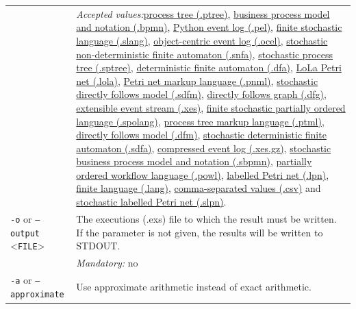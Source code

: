 {\begin{tabularx}{\linewidth}{lX}
&\textit{Accepted values:}\quad \hyperref[filehandler:process tree]{process tree (.ptree)}, \hyperref[filehandler:business process model and notation]{business process model and notation (.bpmn)}, \hyperref[filehandler:Python event log]{Python event log (.pel)}, \hyperref[filehandler:finite stochastic language]{finite stochastic language (.slang)}, \hyperref[filehandler:object-centric event log]{object-centric event log (.ocel)}, \hyperref[filehandler:stochastic non-deterministic finite automaton]{stochastic non-deterministic finite automaton (.snfa)}, \hyperref[filehandler:stochastic process tree]{stochastic process tree (.sptree)}, \hyperref[filehandler:deterministic finite automaton]{deterministic finite automaton (.dfa)}, \hyperref[filehandler:LoLa Petri net]{LoLa Petri net (.lola)}, \hyperref[filehandler:Petri net markup language]{Petri net markup language (.pnml)}, \hyperref[filehandler:stochastic directly follows model]{stochastic directly follows model (.sdfm)}, \hyperref[filehandler:directly follows graph]{directly follows graph (.dfg)}, \hyperref[filehandler:extensible event stream]{extensible event stream (.xes)}, \hyperref[filehandler:finite stochastic partially ordered language]{finite stochastic partially ordered language (.spolang)}, \hyperref[filehandler:process tree markup language]{process tree markup language (.ptml)}, \hyperref[filehandler:directly follows model]{directly follows model (.dfm)}, \hyperref[filehandler:stochastic deterministic finite automaton]{stochastic deterministic finite automaton (.sdfa)}, \hyperref[filehandler:compressed event log]{compressed event log (.xes.gz)}, \hyperref[filehandler:stochastic business process model and notation]{stochastic business process model and notation (.sbpmn)}, \hyperref[filehandler:partially ordered workflow language]{partially ordered workflow language (.powl)}, \hyperref[filehandler:labelled Petri net]{labelled Petri net (.lpn)}, \hyperref[filehandler:finite language]{finite language (.lang)}, \hyperref[filehandler:comma-separated values]{comma-separated values (.csv)} and \hyperref[filehandler:stochastic labelled Petri net]{stochastic labelled Petri net (.slpn)}.\\
\texttt{-o} or \texttt{--output} <\texttt{FILE}> &
The executions (.exs) file to which the result must be written. If the parameter is not given, the results will be written to STDOUT.\\
&\textit{Mandatory:} \quad no\\
\texttt{-a} or \texttt{--approximate} & Use approximate arithmetic instead of exact arithmetic.\\

\end{tabularx}}

